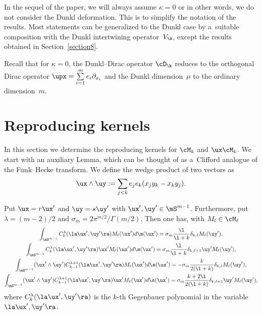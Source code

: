 In the sequel of the paper, we will always assume $\kappa=0$ or in other words, we do not consider
the Dunkl deformation.
This is to simplify the notation of the results.
Most statements can be generalized to the Dunkl case by a~suitable composition with the Dunkl
intertwining operator~$V_{\k}$, except the results obtained in Section~\ref{section8}.

Recall that for $\kappa=0$, the Dunkl--Dirac operator $\cD_{\k}$ reduces to the orthogonal Dirac
operator $\upx=\sum\limits_{i=1}^{m}e_{i}\partial_{x_{i}}$ and the Dunkl dimension~$\mu$ to the ordinary
dimension~$m$.

\section{Reproducing kernels}\label{section5}

In this section we determine the reproducing kernels for $\cM_{k}$ and $\ux\cM_{k}$.
We start with an auxiliary Lemma, which can be thought of as a~Clif\/ford analogue
of the Funk--Hecke transform.
We def\/ine the wedge product of two vectors as
\begin{gather*}
\ux\wedge\uy:=\sum_{j<k}e_{j}e_{k}(x_{j}y_{k}-x_{k}y_{j}).
\end{gather*}

\begin{lemma}
\label{auxintegrals}
Put $\ux=r\ux'$ and $\uy=s\uy'$ with $\ux',\uy'\in\mS^{m-1}$.
Furthermore, put $\lambda=(m-2)/2$ and $\sigma_m=2\pi^{m/2}/\Gamma(m/2)$.
Then one has, with $M_{l}\in\cM_{\ell}$
\begin{gather*}
\int_{\mS^{m-1}} C_{k}^{\lambda}(\la\ux', \uy' \ra) M_{\ell}(\ux')d \s (\ux') = \sigma_m
\frac{\l}{\l+k} \delta_{k, \ell} M_{\ell}(\uy'),\\
\int_{\mS^{m-1}} C_{k}^{\lambda}(\la\ux', \uy' \ra) \ux' M_{\ell}(\ux')d \s (\ux') = \sigma_m
\frac{\l}{\l+k} \delta_{k, \ell+1} \uy' M_{\ell}(\uy'),\\
\int_{\mS^{m-1}} (\ux' \wedge \uy' ) C_{k-1}^{\lambda+1}(\la\ux', \uy' \ra) M_{\ell}(\ux')d \s
(\ux') = - \sigma_m \frac{k}{2(\l+k)} \delta_{k, \ell} M_{\ell}(\uy'),\\
\int_{\mS^{m-1}} (\ux' \wedge \uy' ) C_{k-1}^{\lambda+1}(\la\ux', \uy' \ra) \ux' M_{\ell}(\ux')d
\s (\ux') = \sigma_m \frac{k+2\l}{2(\l+k)} \delta_{k, \ell+1} \uy' M_{\ell}(\uy'),
\end{gather*}
where $C_{k}^{\lambda}(\la\ux',\uy'\ra)$ is the $k$-th Gegenbauer polynomial in the variable
$\la\ux',\uy'\ra$.
\end{lemma}


